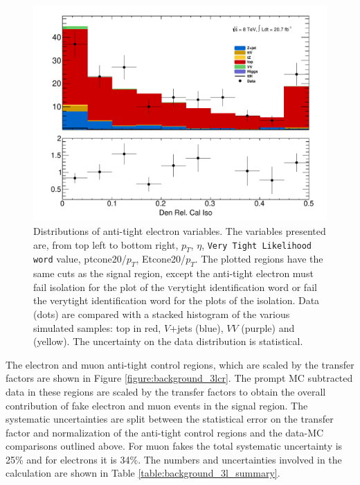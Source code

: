 \begin{figure}[!htbp]
\begin{minipage}[h]{0.5\textwidth}
    \centering \includegraphics[width=\textwidth]{figs/fake/aux_d1_Obj0EtIso20Rel}
  \end{minipage}\hfill
  \caption{Distributions of anti-tight electron variables. The variables presented are, from top left to bottom right, $p_T$, $\eta$, {\tt Very Tight Likelihood word} value, ptcone20/$p_T$, Etcone20/$p_T$. The plotted regions have the same cuts as the signal region, except the anti-tight electron must fail isolation for the plot of the {\textsc verytight} identification word or fail the {verytight} identification word for the plots of the isolation. Data (dots) are compared with a stacked histogram of the various simulated samples: top in red, $V$+jets (blue), $VV$ (purple) and \ttV (yellow). The uncertainty on the data distribution is statistical. }   
  \label{figure:background_electron_dataMC}
\end{figure} 
%

The electron and muon anti-tight control regions, which are scaled by the transfer factors are shown in Figure \ref{figure:background_3lcr}. The prompt MC subtracted data in these regions are scaled by the transfer factors to obtain the overall contribution of fake electron and muon events in the signal region. The systematic uncertainties are split between the statistical error on the transfer factor and normalization of the anti-tight control regions and the data-MC comparisons outlined above. For muon fakes the total systematic uncertainty is 25\% and for electrons it is 34\%. The numbers and uncertainties involved in the calculation are shown in Table \ref{table:background_3l_summary}.  


